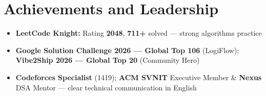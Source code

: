 \documentclass[a4paper,10pt]{article}
\begin{document}
\section{Achievements and Leadership}
\small
\begin{itemize}
  \item \textbf{LeetCode Knight:} Rating \textbf{2048}, \textbf{711+} solved --- strong algorithms practice
  \item \textbf{Google Solution Challenge 2026 --- Global Top 106} (LogiFlow); \textbf{Vibe2Ship 2026 --- Global Top 20} (Community Hero)
  \item \textbf{Codeforces Specialist} (1419); \textbf{ACM SVNIT} Executive Member \& \textbf{Nexus} DSA Mentor --- clear technical communication in English
\end{itemize}
\end{document}
